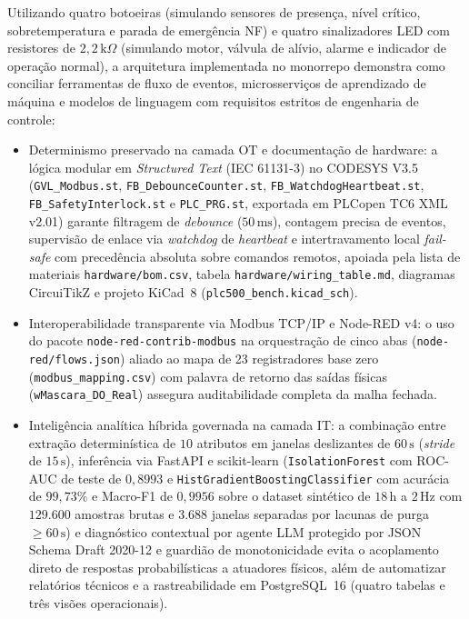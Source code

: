 Utilizando quatro botoeiras (simulando sensores de presença, nível crítico, sobretemperatura e parada de emergência NF) e quatro sinalizadores LED com resistores de $2{,}2\,\text{k}\Omega$ (simulando motor, válvula de alívio, alarme e indicador de operação normal), a arquitetura implementada no monorrepo demonstra como conciliar ferramentas de fluxo de eventos, microsserviços de aprendizado de máquina e modelos de linguagem com requisitos estritos de engenharia de controle:
\begin{itemize}
  \item Determinismo preservado na camada OT e documentação de hardware: a lógica modular em \textit{Structured Text} (IEC 61131-3) no CODESYS V3.5 (\texttt{GVL\_\allowbreak Modbus.st}, \texttt{FB\_\allowbreak Debounce\allowbreak Counter.st}, \texttt{FB\_\allowbreak Watchdog\allowbreak Heartbeat.st}, \texttt{FB\_\allowbreak Safety\allowbreak Interlock.st} e \texttt{PLC\_\allowbreak PRG.st}, exportada em PLCopen TC6 XML v2.01) garante filtragem de \textit{debounce} ($50\,\text{ms}$), contagem precisa de eventos, supervisão de enlace via \textit{watchdog} de \textit{heartbeat} e intertravamento local \textit{fail-safe} com precedência absoluta sobre comandos remotos, apoiada pela lista de materiais \texttt{hardware/\allowbreak bom.csv}, tabela \texttt{hardware/\allowbreak wiring\_\allowbreak table.md}, diagramas CircuiTikZ e projeto KiCad~8 (\texttt{plc500\_\allowbreak bench.kicad\_\allowbreak sch}).
  \item Interoperabilidade transparente via Modbus TCP/IP e Node-RED v4: o uso do pacote \texttt{node-red-\allowbreak contrib-\allowbreak modbus} na orquestração de cinco abas (\texttt{node-red/\allowbreak flows.json}) aliado ao mapa de 23 registradores base zero (\texttt{modbus\_\allowbreak mapping.csv}) com palavra de retorno das saídas físicas (\texttt{wMascara\_\allowbreak DO\_\allowbreak Real}) assegura auditabilidade completa da malha fechada.
  \item Inteligência analítica híbrida governada na camada IT: a combinação entre extração determinística de $10$ atributos em janelas deslizantes de $60\,\text{s}$ (\textit{stride} de $15\,\text{s}$), inferência via FastAPI e scikit-learn (\texttt{IsolationForest} com ROC-AUC de teste de $0{,}8993$ e \texttt{HistGradientBoostingClassifier} com acurácia de $99{,}73\%$ e Macro-F1 de $0{,}9956$ sobre o dataset sintético de $18\,\text{h}$ a $2\,\text{Hz}$ com $129.600$ amostras brutas e $3.688$ janelas separadas por lacunas de purga $\ge 60\,\text{s}$) e diagnóstico contextual por agente LLM protegido por JSON Schema Draft 2020-12 e guardião de monotonicidade evita o acoplamento direto de respostas probabilísticas a atuadores físicos, além de automatizar relatórios técnicos e a rastreabilidade em PostgreSQL~16 (quatro tabelas e três visões operacionais).

\end{itemize}
